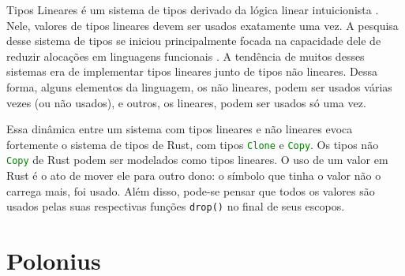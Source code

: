 Tipos Lineares é um sistema de tipos derivado da lógica linear intuicionista \cite{CSLINLOG}. Nele, valores de tipos lineares devem ser usados exatamente uma vez. A pesquisa desse sistema de tipos se iniciou principalmente focada na capacidade dele de reduzir alocações em linguagens funcionais \cite{Wadler1990LinearTC}. A tendência de muitos desses sistemas era de implementar tipos lineares junto de tipos não lineares. Dessa forma, alguns elementos da linguagem, os não lineares, podem ser usados várias vezes (ou não usados), e outros, os lineares, podem ser usados só uma vez. 

Essa dinâmica entre um sistema com tipos lineares e não lineares evoca fortemente o sistema de tipos de Rust, com tipos \lstinline[language=Rust]|Clone| e \lstinline[language=Rust]|Copy|. Os tipos não \lstinline[language=Rust]|Copy| de Rust podem ser modelados como tipos lineares. O uso de um valor em Rust é o ato de mover ele para outro dono: o símbolo que tinha o valor não o carrega mais, foi usado. Além disso, pode-se pensar que todos os valores são usados pelas suas respectivas funções \lstinline[language=Rust]|drop()| no final de seus escopos.

\section{Polonius}

